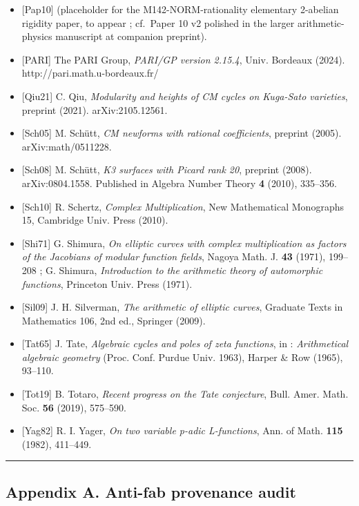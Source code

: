 \documentclass[
  11pt,
  a4paper,
]{amsart}
\begin{document}
\begin{itemize}
\item
  {[}Pap10{]} (placeholder for the M142-NORM-rationality elementary 2-abelian rigidity paper, to appear ; cf.~Paper 10 v2 polished in the larger arithmetic-physics manuscript at companion preprint).
\item
  {[}PARI{]} The PARI Group, \emph{PARI/GP version 2.15.4}, Univ. Bordeaux (2024). http://pari.math.u-bordeaux.fr/
\item
  {[}Qiu21{]} C. Qiu, \emph{Modularity and heights of CM cycles on Kuga-Sato varieties}, preprint (2021). arXiv:2105.12561.
\item
  {[}Sch05{]} M. Schütt, \emph{CM newforms with rational coefficients}, preprint (2005). arXiv:math/0511228.
\item
  {[}Sch08{]} M. Schütt, \emph{K3 surfaces with Picard rank 20}, preprint (2008). arXiv:0804.1558. Published in Algebra Number Theory \textbf{4} (2010), 335--356.
\item
  {[}Sch10{]} R. Schertz, \emph{Complex Multiplication}, New Mathematical Monographs 15, Cambridge Univ. Press (2010).
\item
  {[}Shi71{]} G. Shimura, \emph{On elliptic curves with complex multiplication as factors of the Jacobians of modular function fields}, Nagoya Math. J. \textbf{43} (1971), 199--208 ; G. Shimura, \emph{Introduction to the arithmetic theory of automorphic functions}, Princeton Univ. Press (1971).
\item
  {[}Sil09{]} J. H. Silverman, \emph{The arithmetic of elliptic curves}, Graduate Texts in Mathematics 106, 2nd ed., Springer (2009).
\item
  {[}Tat65{]} J. Tate, \emph{Algebraic cycles and poles of zeta functions}, in : \emph{Arithmetical algebraic geometry} (Proc. Conf. Purdue Univ. 1963), Harper \& Row (1965), 93--110.
\item
  {[}Tot19{]} B. Totaro, \emph{Recent progress on the Tate conjecture}, Bull. Amer. Math. Soc. \textbf{56} (2019), 575--590.
\item
  {[}Yag82{]} R. I. Yager, \emph{On two variable p-adic L-functions}, Ann. of Math. \textbf{115} (1982), 411--449.
\end{itemize}

\begin{center}\rule{0.5\linewidth}{0.5pt}\end{center}

\hypertarget{appendix-a.-anti-fab-provenance-audit}{%
\subsection{Appendix A. Anti-fab provenance audit}\label{appendix-a.-anti-fab-provenance-audit}}
\end{document}
